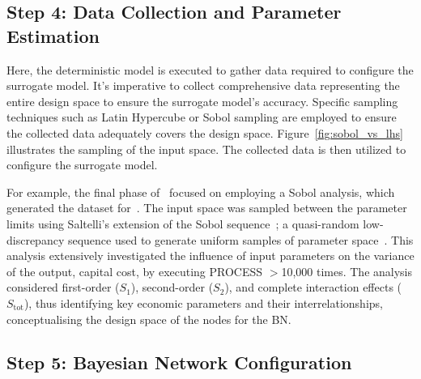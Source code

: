 \documentclass[journal]{IEEEtran}
\begin{document}
\subsection{\textbf{Step 4}: Data Collection and Parameter Estimation}\label{sec:data} 


Here, the deterministic model is executed to gather data required to configure the surrogate model. It's imperative to collect comprehensive data representing the entire design space to ensure the surrogate model's accuracy. Specific sampling techniques such as Latin Hypercube or Sobol sampling are employed to ensure the collected data adequately covers the design space. Figure~\ref{fig:sobol_vs_lhs} illustrates the sampling of the input space. The collected data is then utilized to configure the surrogate model. 

For example, the final phase of~\cite{Hidalgo-Salaverri2023} focused on employing a Sobol analysis, which generated the dataset for~\cite{Griffiths2024}. The input space was sampled between the parameter limits using Saltelli's extension of the Sobol sequence~\cite{Sobol2001, Saltelli2002}; a quasi-random low-discrepancy sequence used to generate uniform samples of parameter space~\cite{Herman2023}. This analysis extensively investigated the influence of input parameters on the variance of the output, capital cost, by executing PROCESS $>$10,000 times. The analysis considered first-order ($S_{1}$), second-order ($S_{2}$), and complete interaction effects ($S_{\text{tot}}$), thus identifying key economic parameters and their interrelationships, conceptualising the design space of the nodes for the BN.\@

\subsection{\textbf{Step 5}: Bayesian Network Configuration}\label{sec:BNconfiguration}
\end{document}
